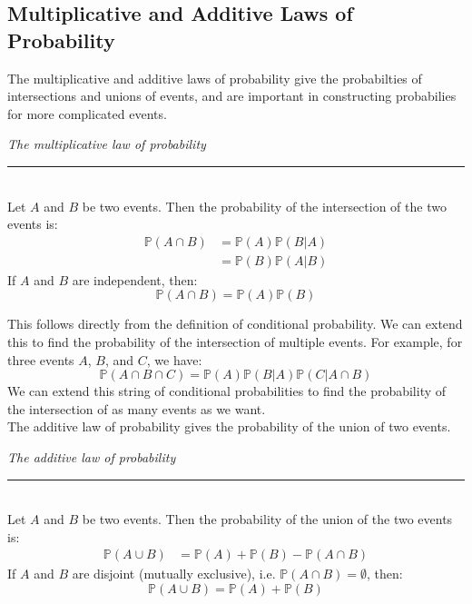 \documentclass[12pt]{article}
\theoremstyle{definition}
\theoremstyle{remark}
\def\P{{\mathbb P}}
\begin{document}
\subsection{Multiplicative and Additive Laws of Probability}
The multiplicative and additive laws of probability give the probabilties of intersections and unions of events, and are important in constructing probabilies for more complicated events.

\begin{framed}
\emph{The multiplicative law of probability}\\
  \rule{\dimexpr{}\fboxrule}{.1pt} \\
Let $A$ and $B$ be two events. Then the probability of the intersection of the two events is:
\begin{align*}
\P(A \cap B) &= \P(A)\P(B|A) \\
&= \P(B)\P(A|B)
\end{align*}
If $A$ and $B$ are independent, then:
\[
\P(A \cap B) = \P(A)\P(B)
\]
\end{framed}
This follows directly from the definition of conditional probability. We can extend this to find the probability of the intersection of multiple events. For example, for three events $A$, $B$, and $C$, we have:
\[
\P(A \cap B \cap C) = \P(A)\P(B|A)\P(C|A\cap B)
\]
We can extend this string of conditional probabilities to find the probability of the intersection of as many events as we want. \\

The additive law of probability gives the probability of the union of two events.
\begin{framed}
\emph{The additive law of probability}\\
  \rule{\dimexpr{}\fboxrule}{.1pt} \\
Let $A$ and $B$ be two events. Then the probability of the union of the two events is:
\begin{align*}
\P(A \cup B) &= \P(A) + \P(B) - \P(A \cap B) 
\end{align*}
If $A$ and $B$ are disjoint (mutually exclusive), i.e. $\P(A \cap B) = \emptyset$, then:
\[
\P(A \cup B) = \P(A) + \P(B)
\]
\end{framed}
\end{document}
